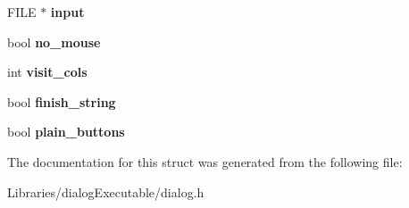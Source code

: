 \begin{DoxyCompactItemize}
\item 
F\+I\+LE $\ast$ {\bfseries input}\hypertarget{struct_d_i_a_l_o_g___s_t_a_t_e_a6ec323af0b2bb5216bde7cc7b2aaa61f}{}\label{struct_d_i_a_l_o_g___s_t_a_t_e_a6ec323af0b2bb5216bde7cc7b2aaa61f}

\item 
bool {\bfseries no\+\_\+mouse}\hypertarget{struct_d_i_a_l_o_g___s_t_a_t_e_a2be51af6fece13970064d6cb6ac3c399}{}\label{struct_d_i_a_l_o_g___s_t_a_t_e_a2be51af6fece13970064d6cb6ac3c399}

\item 
int {\bfseries visit\+\_\+cols}\hypertarget{struct_d_i_a_l_o_g___s_t_a_t_e_af74e677ae46514f95a7d15d72cb6f506}{}\label{struct_d_i_a_l_o_g___s_t_a_t_e_af74e677ae46514f95a7d15d72cb6f506}

\item 
bool {\bfseries finish\+\_\+string}\hypertarget{struct_d_i_a_l_o_g___s_t_a_t_e_acf77b55606f86223a9b426f890d2b65e}{}\label{struct_d_i_a_l_o_g___s_t_a_t_e_acf77b55606f86223a9b426f890d2b65e}

\item 
bool {\bfseries plain\+\_\+buttons}\hypertarget{struct_d_i_a_l_o_g___s_t_a_t_e_aba7c9912ff7f69afbe8498eedcefbefa}{}\label{struct_d_i_a_l_o_g___s_t_a_t_e_aba7c9912ff7f69afbe8498eedcefbefa}

\end{DoxyCompactItemize}


The documentation for this struct was generated from the following file\+:\begin{DoxyCompactItemize}
\item 
Libraries/dialog\+Executable/dialog.\+h\end{DoxyCompactItemize}
